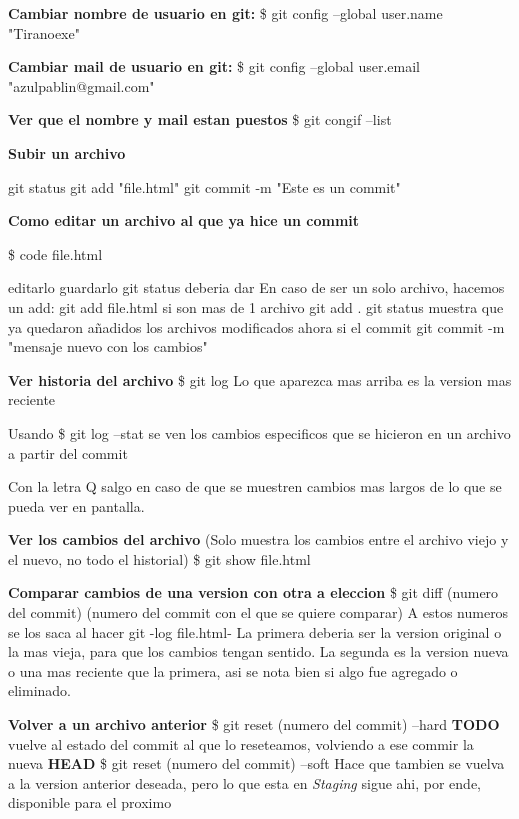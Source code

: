  \begin{center}
  
\textbf{Cambiar nombre de usuario en git:}
  \$ git config --global user.name "Tiranoexe"

\textbf{Cambiar mail de usuario en git:}
  \$ git config --global user.email "azulpablin@gmail.com"

\textbf{Ver que el nombre y mail estan puestos}
  \$ git congif --list
 

\textbf{Subir un archivo}

git status
git add "file.html"
git commit -m "Este es un commit"


\textbf{Como editar un archivo al que ya hice un commit}

  \$ code file.html

  editarlo
  guardarlo
  git status
  deberia dar 
  En caso de ser un solo archivo, hacemos un add:
  git add file.html
  si son mas de 1 archivo
  git add . 
  git status muestra que ya quedaron añadidos los archivos modificados
  ahora si el commit
  git commit -m "mensaje nuevo con los cambios"

\textbf{Ver historia del archivo}
\$ git log 
Lo que aparezca mas arriba es la version mas reciente

Usando \$ git log --stat se ven los cambios especificos que se hicieron en un archivo a partir del commit 

Con la letra Q salgo en caso de que se muestren cambios mas largos de lo que se pueda ver en pantalla.

\textbf{Ver los cambios del archivo} 
(Solo muestra los cambios entre el archivo viejo y el nuevo, no todo el historial)
\$ git show file.html

\textbf{Comparar cambios de una version con otra a eleccion}
\$ git diff (numero del commit) (numero del commit con el que se quiere comparar)
A estos numeros se los saca al hacer git -log file.html-
La primera deberia ser la version original o la mas vieja, para que los cambios tengan sentido.
La segunda es la version nueva o una mas reciente que la primera, asi se nota bien si algo fue agregado o eliminado.


\textbf{Volver a un archivo anterior}
\$ git reset (numero del commit) --hard \textbf{TODO} vuelve al estado del commit al que lo reseteamos, volviendo a ese commir la nueva \textbf{HEAD}
\$ git reset (numero del commit) --soft Hace que tambien se vuelva a la version anterior deseada, pero lo que esta en \textit{Staging} sigue ahi, por ende, disponible para el proximo  
 



\end{center}



